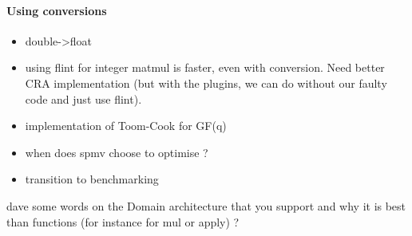 \paragraph{Using conversions}
\begin{itemize}
	\item
 double->float
	\item
 using flint for integer matmul is faster, even with conversion. Need better CRA implementation (but with the plugins, we can do without our faulty code and just use flint).
	\item
 implementation of Toom-Cook for GF(q)
	\item
 when does spmv choose to optimise ?
	\item
 transition to benchmarking
\end{itemize}
%
\danger dave some words on the Domain architecture that you support and why it is best than functions (for instance for mul or apply) ?
